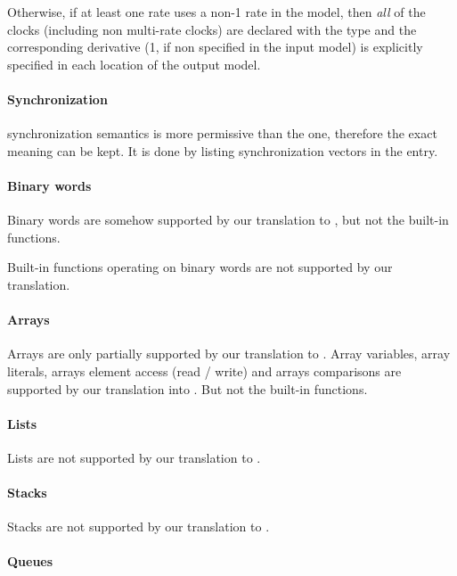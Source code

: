 Otherwise, if at least one rate uses a non-1 rate in the \imitator{} model, then \emph{all} of the clocks (including non multi-rate clocks) are declared with the  type and the corresponding derivative (1, if non specified in the \imitator{} input model) is explicitly specified in each location of the output model.

\paragraph{Synchronization}
\jani{} synchronization semantics is more permissive than the \imitator{} one, therefore the exact meaning can be kept.
It is done by listing synchronization vectors in the  entry.

\paragraph{Binary words}
Binary words are somehow supported by our translation to \jani{}, but not the built-in functions.

\begin{becareful}
	Built-in functions operating on binary words are not supported by our translation.
\end{becareful}

\paragraph{Arrays}

Arrays are only partially supported by our translation to \jani{}.
%
Array variables, array literals, arrays element access (read / write) and arrays comparisons are supported by our translation into \jani{}.
But not the built-in functions.

\paragraph{Lists}

Lists are not supported by our translation to \jani{}.

\paragraph{Stacks}

Stacks are not supported by our translation to \jani{}.

\paragraph{Queues}

